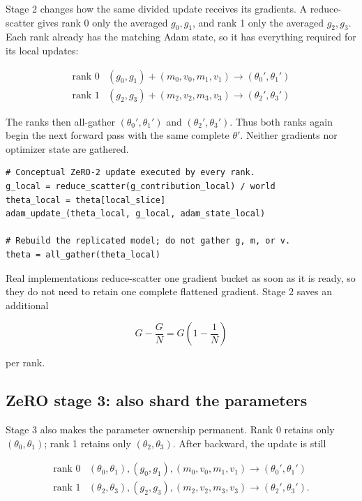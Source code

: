 \documentclass[11pt]{article}
\begin{document}
Stage 2 changes how the same divided update receives its gradients. A
reduce-scatter gives rank 0 only the averaged \(g_0,g_1\), and rank 1 only the
averaged \(g_2,g_3\). Each rank already has the matching Adam state, so it has
everything required for its local updates:

\[
\begin{array}{c|c}
\text{rank 0} & (g_0,g_1)+(m_0,v_0,m_1,v_1)
    \longrightarrow (\theta_0',\theta_1') \\
\text{rank 1} & (g_2,g_3)+(m_2,v_2,m_3,v_3)
    \longrightarrow (\theta_2',\theta_3')
\end{array}
\]

The ranks then all-gather \((\theta_0',\theta_1')\) and
\((\theta_2',\theta_3')\). Thus both ranks again begin the next forward pass
with the same complete \(\theta'\). Neither gradients nor optimizer state are
gathered.

\begin{lstlisting}[basicstyle=\ttfamily\footnotesize]
# Conceptual ZeRO-2 update executed by every rank.
g_local = reduce_scatter(g_contribution_local) / world
theta_local = theta[local_slice]
adam_update_(theta_local, g_local, adam_state_local)

# Rebuild the replicated model; do not gather g, m, or v.
theta = all_gather(theta_local)
\end{lstlisting}

Real implementations reduce-scatter one gradient bucket as soon as it is
ready, so they do not need to retain one complete flattened gradient. Stage 2
saves an additional

\[
G-\frac{G}{N}=G\left(1-\frac{1}{N}\right)
\]

per rank.

\subsection{ZeRO stage 3: also shard the parameters}

Stage 3 also makes the parameter ownership permanent. Rank 0 retains only
\((\theta_0,\theta_1)\); rank 1 retains only
\((\theta_2,\theta_3)\). After backward, the update is still

\[
\begin{array}{c|c}
\text{rank 0} & (\theta_0,\theta_1),(g_0,g_1),(m_0,v_0,m_1,v_1)
    \longrightarrow (\theta_0',\theta_1') \\
\text{rank 1} & (\theta_2,\theta_3),(g_2,g_3),(m_2,v_2,m_3,v_3)
    \longrightarrow (\theta_2',\theta_3').
\end{array}
\]
\end{document}
